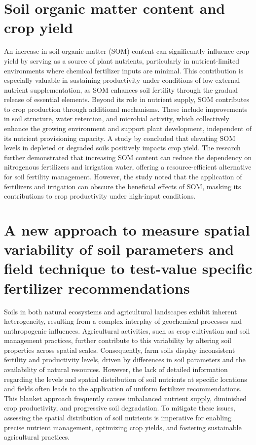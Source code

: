 \documentclass[a4paper,12pt]{article}
\begin{document}
\section{Soil organic matter content and crop yield}
\parencite{lalSoilOrganicMatter2020}
An increase in soil organic matter (SOM) content can significantly influence crop yield by serving as a source of plant nutrients, particularly in nutrient-limited environments where chemical fertilizer inputs are minimal. This contribution is especially valuable in sustaining productivity under conditions of low external nutrient supplementation, as SOM enhances soil fertility through the gradual release of essential elements.
Beyond its role in nutrient supply, SOM contributes to crop production through additional mechanisms. These include improvements in soil structure, water retention, and microbial activity, which collectively enhance the growing environment and support plant development, independent of its nutrient provisioning capacity.
A study by \parencite{lalSoilOrganicMatter2020} concluded that elevating SOM levels in depleted or degraded soils positively impacts crop yield. The research further demonstrated that increasing SOM content can reduce the dependency on nitrogenous fertilizers and irrigation water, offering a resource-efficient alternative for soil fertility management. However, the study noted that the application of fertilizers and irrigation can obscure the beneficial effects of SOM, masking its contributions to crop productivity under high-input conditions.




\section{A new approach to measure spatial variability of soil parameters and field  technique to test-value specific fertilizer recommendations}
\parencite{dahalNewApproachMeasure2024a}
Soils in both natural ecosystems and agricultural landscapes exhibit inherent heterogeneity, resulting from a complex interplay of geochemical processes and anthropogenic influences. Agricultural activities, such as crop cultivation and soil management practices, further contribute to this variability by altering soil properties across spatial scales. Consequently, farm soils display inconsistent fertility and productivity levels, driven by differences in soil parameters and the availability of natural resources. However, the lack of detailed information regarding the levels and spatial distribution of soil nutrients at specific locations and fields often leads to the application of uniform fertilizer recommendations. This blanket approach frequently causes imbalanced nutrient supply, diminished crop productivity, and progressive soil degradation. To mitigate these issues, assessing the spatial distribution of soil nutrients is imperative for enabling precise nutrient management, optimizing crop yields, and fostering sustainable agricultural practices.
\end{document}

